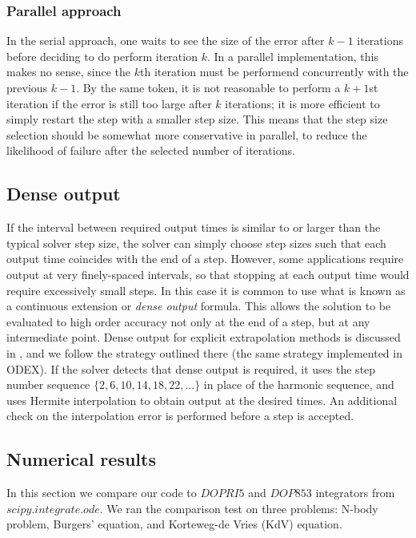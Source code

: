 \documentclass[12pt]{article}
\begin{document}
\subsubsection{Parallel approach}
In the serial approach, one waits to see the size of the error
after $k-1$ iterations before deciding to do perform iteration $k$.
In a parallel implementation, this makes no sense, since the $k$th
iteration must be performend concurrently with the previous $k-1$.
By the same token, it is not reasonable to perform a $k+1$st
iteration if the error is still too large after $k$ iterations;
it is more efficient to simply restart the step with a smaller
step size.
This means that the step size selection should be somewhat more
conservative in parallel, to reduce the likelihood of failure
after the selected number of iterations.


\subsection{Dense output}
If the interval between required output times is similar to or larger
than the typical solver step size, the solver can simply choose step
sizes such that each output time coincides with the end of a step.
However, some applications require output at very finely-spaced intervals,
so that stopping at each output time would require excessively small steps.
In this case it is common to use what is known as a continuous extension
or {\em dense output} formula.  This allows the solution to be evaluated
to high order accuracy not only at the end of a step, but at any intermediate point.
Dense output for explicit extrapolation methods is discussed in \cite[pp. 237-241]{Hairer1993},
and we follow the strategy outlined there (the same strategy implemented in ODEX).
If the solver detects that dense output is required, it uses the step number sequence
$\{2, 6, 10, 14, 18, 22, \dots\}$ in place of the harmonic sequence, and uses
Hermite interpolation to obtain output at the desired times.  An additional check
on the interpolation error is performed before a step is accepted.


\subsection{Numerical results}
In this section we compare our code to $DOPRI5$ and $DOP853$ integrators from $scipy.integrate.ode$. We ran the comparison test on three problems: N-body problem, Burgers' equation, and Korteweg-de Vries (KdV) equation. 
\end{document}
